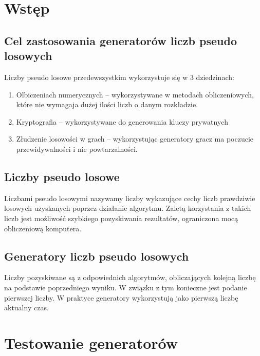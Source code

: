 \documentclass[11pt]{aghdpl}
\author{Żaneta Błaszczuk, Rafał Kozik, Filip Kubicz, Jakub Nowak, Jakub Porębski}
\date{2014}
\begin{document}
\titlepages
\section{Wstęp}
\subsection{Cel zastosowania generatorów liczb pseudo losowych}
Liczby pseudo losowe przedewszystkim wykorzystuje się w 3 dziedzinach:
\begin{enumerate}
\item Olbiczeniach numerycznych – wykorzystywane w metodach obliczeniowych, które nie wymagaja dużej ilości liczb o danym rozkładzie.
\item Kryptografia – wykorzystywane do generowania kluczy prywatnych
\item Złudzenie losowości w grach – wykorzystując generatory gracz ma poczucie przewidywalności i nie powtarzalności.  
\end{enumerate}
\subsection{Liczby pseudo losowe}
Liczbami pseudo losowymi nazywamy liczby wykazujące cechy liczb prawdziwie losowych uzyskanych poprzez działanie algorytmu. Zaletą korzystania z takich liczb jest możliwość szybkiego pozyskiwania rezultatów, ograniczona mocą obliczeniową komputera.
\subsection{Generatory liczb pseudo losowych}
Liczby pozyskiwane są z odpowiednich algorytmów, obliczających kolejną liczbę na podstawie poprzedniego wyniku. W związku z tym konieczne jest podanie pierwszej liczby. W praktyce generatory wykorzystują jako pierwszą liczbę aktualny czas. 
\section{Testowanie generatorów}
\end{document}
